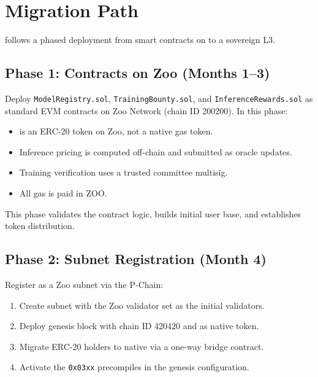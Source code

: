 \section{Migration Path}
\label{sec:migration}

\Beluga{} follows a phased deployment from smart contracts on \Zoo{} to a sovereign L3.

\subsection{Phase 1: Contracts on Zoo (Months 1--3)}

Deploy \texttt{ModelRegistry.sol}, \texttt{TrainingBounty.sol}, and \texttt{InferenceRewards.sol} as standard EVM contracts on Zoo Network (chain ID 200200). In this phase:

\begin{itemize}[nosep]
    \item \BLG{} is an ERC-20 token on Zoo, not a native gas token.
    \item Inference pricing is computed off-chain and submitted as oracle updates.
    \item Training verification uses a trusted committee multisig.
    \item All gas is paid in ZOO.
\end{itemize}

This phase validates the contract logic, builds initial user base, and establishes token distribution.

\subsection{Phase 2: Subnet Registration (Month 4)}

Register \Beluga{} as a Zoo subnet via the P-Chain:

\begin{enumerate}[nosep]
    \item Create subnet with the Zoo validator set as the initial validators.
    \item Deploy \Beluga{} genesis block with chain ID 420420 and \BLG{} as native token.
    \item Migrate ERC-20 \BLG{} holders to native \BLG{} via a one-way bridge contract.
    \item Activate the \texttt{0x03xx} precompiles in the genesis configuration.
\end{enumerate}

